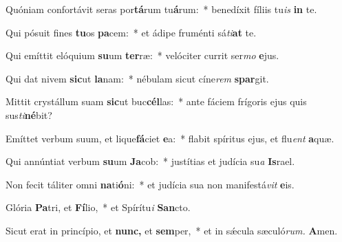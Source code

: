 \item Quóniam confortávit seras por\textbf{tá}rum tu\textbf{á}rum:~* benedíxit fíliis tu\hspace*{0.02em}\textit{is} \textbf{in} te.
\item Qui pósuit fines \textbf{tu}os \textbf{pa}cem:~* et ádipe fruménti sá\hspace*{0.02em}\textit{ti}\textbf{at} te.
\item Qui emíttit elóquium \textbf{su}um \textbf{ter}ræ:~* velóciter currit ser\textit{mo} \textbf{e}jus.
\item Qui dat nivem \textbf{sic}ut \textbf{la}nam:~* nébulam sicut cíne\hspace*{0.02em}\textit{rem} \textbf{spar}git.
\item Mittit crystállum suam \textbf{sic}ut buc\textbf{cél}las:~* ante fáciem frígoris ejus quis sus\hspace*{0.02em}\textit{ti}\textbf{né}bit?
\item Emíttet verbum suum, et lique\textbf{fá}ciet \textbf{e}a:~* flabit spíritus ejus, et flu\hspace*{0.02em}\textit{ent} \textbf{a}quæ.
\item Qui annúntiat verbum \textbf{su}um \textbf{Ja}cob:~* justítias et judícia su\hspace*{0.02em}\textit{a} \textbf{Is}rael.
\item Non fecit táliter omni \textbf{na}ti\textbf{ó}ni:~* et judícia sua non manifestá\textit{vit} \textbf{e}is.
\item Glória \textbf{Pa}tri, et \textbf{Fí}lio,~* et Spírítu\textit{i} \textbf{San}cto.
\item Sicut erat in princípio, et \textbf{nunc,} et \textbf{sem}per,~* et in sǽcula sæculó\textit{rum.} \textbf{A}men.
